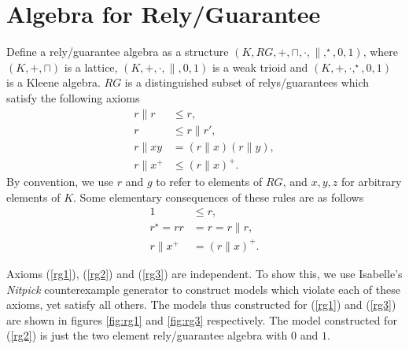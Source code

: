 \documentclass{llncs}
\begin{document}
\begin{prooftree}
\end{prooftree}

\begin{prooftree}
\end{prooftree}

\newpage
\section{Algebra for Rely/Guarantee}

Define a rely/guarantee algebra as a structure
$(K,RG,+,\sqcap,\cdot,\|,^\star,0,1)$, where $(K,+,\sqcap)$ is a
lattice, $(K,+,\cdot,\|,0,1)$ is a weak trioid and
$(K,+,\cdot,^\star,0,1)$ is a Kleene algebra. $RG$ is a distinguished
subset of relys/guarantees which satisfy the following axioms
\begin{align}
r\|r &\le r, \label{rg1}\\
r &\le r\|r', \label{rg2}\\
r\|xy &= (r\|x)(r\|y), \label{rg3}\\
r\|x^+ &\le (r\|x)^+ \label{rg4}.
\end{align}
By convention, we use $r$ and $g$ to refer to elements of $RG$, and
$x,y,z$ for arbitrary elements of $K$. Some elementary consequences of these rules are as follows
\begin{align*}
1 &\le r,\\
r^\star = rr &= r = r\|r,\\
r\|x^+ &= (r\|x)^+.
\end{align*}

Axioms (\ref{rg1}), (\ref{rg2}) and (\ref{rg3}) are independent. To
show this, we use Isabelle's \emph{Nitpick} counterexample generator
to construct models which violate each of these axioms, yet satisfy
all others. The models thus constructed for (\ref{rg1}) and
(\ref{rg3}) are shown in figures \ref{fig:rg1} and \ref{fig:rg3}
respectively. The model constructed for (\ref{rg2}) is just the two
element rely/guarantee algebra with $0$ and $1$.
\end{document}
